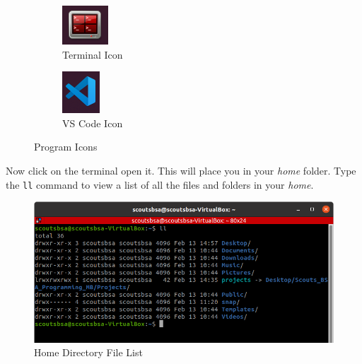     \begin{figure}[ht]
      \centering
      \begin{subfigure}{0.4\textwidth}
        \centering
        \includegraphics[width=0.5\linewidth]{./images/terminal.png}
        \caption{Terminal Icon}
        \label{fig:terminal_icon}
      \end{subfigure}
      \begin{subfigure}{0.4\textwidth}
        \centering
        \includegraphics[width=0.5\linewidth]{./images/vs_code.png}
        \caption{VS Code Icon}
        \label{fig:vs_code_icon}
      \end{subfigure}
      \caption{Program Icons}
      \label{fig:program_icons}
    \end{figure}

    \FloatBarrier

    Now click on the terminal open it.
    This will place you in your \textit{home} folder.
    Type the \texttt{ll} command to view a list of all the files and folders in your \textit{home}.

    \begin{figure}[ht]
      \centering
      \includegraphics[width=0.8\linewidth]{./images/home_file_list.png}
      \caption{Home Directory File List}
      \label{fig:home_file_list}
    \end{figure}

